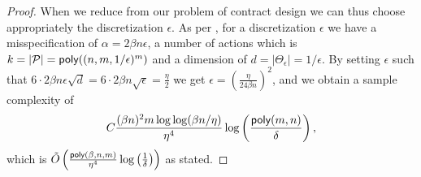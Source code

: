 \begin{proof}
    When we reduce from our problem of contract design we can thus choose appropriately the discretization $\epsilon$. As per , for a discretization $\epsilon$ we have a misspecification of $\alpha = 2\beta n \epsilon$, a number of actions which is $k=|\mathcal{P}|=\textsf{poly}((n,m,1/\epsilon)^m)$ and a dimension of $d=|\Theta_\epsilon|=1/\epsilon$. By setting $\epsilon$ such that $6\cdot 2\beta n\epsilon\sqrt{d}=6\cdot 2\beta n\sqrt{\epsilon}=\frac\eta2$ we get $\epsilon = (\frac{\eta}{24\beta n})^2$, and we obtain a sample complexity of 
    \[
        C\frac{(\beta n)^2m\log\log(\beta n/\eta)}{\eta^4}\log\left(\frac{\textsf{poly}(m,n)}{\delta}\right),
    \]
    which is $\tilde O\left(\frac{\textsf{poly}(\beta,n,m)}{\eta^4}\log\left(\frac1\delta\right)\right)$ as stated.
\end{proof}
